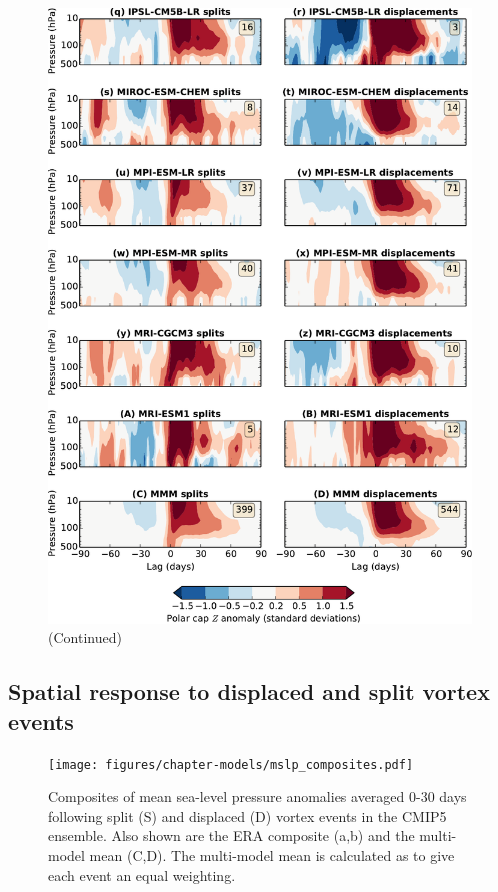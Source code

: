 \begin{figure}
 \ContinuedFloat
 \centering
 \noindent\includegraphics[width=\textwidth]{figures/chapter-models/dripping_paint2.pdf}
 \caption[]{(Continued)}
\end{figure}


\subsection{Spatial response to displaced and split vortex events}

\begin{figure}
 \centering
 \noindent\texttt{[image: figures/chapter-models/mslp\_composites.pdf]}
 \caption[MSLP composites following splits and displacements in the CMIP5
 models]{Composites of mean sea-level pressure anomalies averaged 0-30 days
   following split (S) and displaced (D) vortex events in the CMIP5
   ensemble. Also shown are the ERA composite (a,b) and the multi-model mean
   (C,D). The multi-model mean is calculated as to give each event an equal
   weighting.}
 \label{fig:cmip5_mslp_comp}
\end{figure}

